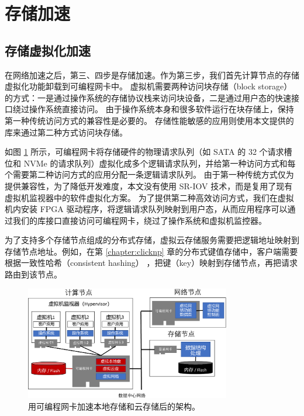 \section{存储加速}

\subsection{存储虚拟化加速}

在网络加速之后，第三、四步是存储加速。作为第三步，我们首先计算节点的存储虚拟化功能卸载到可编程网卡中。
虚拟机需要两种访问块存储（block storage）的方式：一是通过操作系统的存储协议栈来访问块设备，二是通过用户态的快速接口绕过操作系统直接访问。
由于操作系统本身和很多软件运行在块存储上，保持第一种传统访问方式的兼容性是必要的。
存储性能敏感的应用则使用本文提供的库来通过第二种方式访问块存储。

如图 \ref{arch:fig:virt-storage} 所示，可编程网卡将存储硬件的物理请求队列（如 SATA 的 32 个请求槽位和 NVMe 的请求队列）虚拟化成多个逻辑请求队列，并给第一种访问方式和每个需要第二种访问方式的应用分配一条逻辑请求队列。
由于第一种传统方式仅为提供兼容性，为了降低开发难度，本文没有使用 SR-IOV 技术，而是复用了现有虚拟机监视器中的软件虚拟化方案。
为了提供第二种高效访问方式，我们在虚拟机内安装 FPGA 驱动程序，将逻辑请求队列映射到用户态，从而应用程序可以通过我们的库接口直接访问可编程网卡，绕过了操作系统和虚拟机监控器。

为了支持多个存储节点组成的分布式存储，虚拟云存储服务需要把逻辑地址映射到存储节点地址。例如，在第 \ref{chapter:clicknp} 章的分布式键值存储中，客户端需要根据一致性哈希（consistent hashing） \cite{nishtala2013scaling}，把键（key）映射到存储节点，再把请求路由到该节点。

\begin{figure}[htbp]
	\centering
	\includegraphics[width=0.8\textwidth]{figures/virt_storage.pdf}
	\caption{用可编程网卡加速本地存储和云存储后的架构。}
	\label{arch:fig:virt-storage}
\end{figure}

